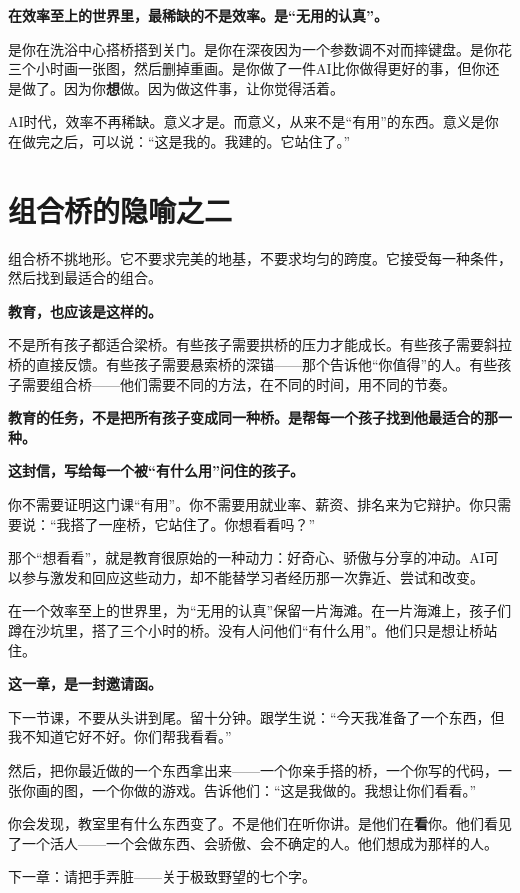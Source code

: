 \begin{insight}
\label{insight:chap14}

\textbf{在效率至上的世界里，最稀缺的不是效率。是``无用的认真''。}

是你在洗浴中心搭桥搭到关门。是你在深夜因为一个参数调不对而摔键盘。是你花三个小时画一张图，然后删掉重画。是你做了一件AI比你做得更好的事，但你还是做了。因为你\textbf{想}做。因为做这件事，让你觉得活着。

AI时代，效率不再稀缺。意义才是。而意义，从来不是``有用''的东西。意义是你在做完之后，可以说：``这是我的。我建的。它站住了。''
\end{insight}

\section{组合桥的隐喻之二}

组合桥不挑地形。它不要求完美的地基，不要求均匀的跨度。它接受每一种条件，然后找到最适合的组合。

\textbf{教育，也应该是这样的。}

不是所有孩子都适合梁桥。有些孩子需要拱桥的压力才能成长。有些孩子需要斜拉桥的直接反馈。有些孩子需要悬索桥的深锚——那个告诉他``你值得''的人。有些孩子需要组合桥——他们需要不同的方法，在不同的时间，用不同的节奏。

\textbf{教育的任务，不是把所有孩子变成同一种桥。是帮每一个孩子找到他最适合的那一种。}

\begin{shiyu-note}
\label{note:chap14}

\textbf{这封信，写给每一个被``有什么用''问住的孩子。}

你不需要证明这门课``有用''。你不需要用就业率、薪资、排名来为它辩护。你只需要说：``我搭了一座桥，它站住了。你想看看吗？''

那个``想看看''，就是教育很原始的一种动力：好奇心、骄傲与分享的冲动。AI可以参与激发和回应这些动力，却不能替学习者经历那一次靠近、尝试和改变。

在一个效率至上的世界里，为``无用的认真''保留一片海滩。在一片海滩上，孩子们蹲在沙坑里，搭了三个小时的桥。没有人问他们``有什么用''。他们只是想让桥站住。
\end{shiyu-note}

\vspace{1cm}

\begin{decision-point}
\label{decision:chap14}

\noindent\textbf{这一章，是一封邀请函。}

\vspace{0.3cm}

\noindent 下一节课，不要从头讲到尾。留十分钟。跟学生说：``今天我准备了一个东西，但我不知道它好不好。你们帮我看看。''

\noindent 然后，把你最近做的一个东西拿出来——一个你亲手搭的桥，一个你写的代码，一张你画的图，一个你做的游戏。告诉他们：``这是我做的。我想让你们看看。''

\noindent 你会发现，教室里有什么东西变了。不是他们在听你讲。是他们在\textbf{看}你。他们看见了一个活人——一个会做东西、会骄傲、会不确定的人。他们想成为那样的人。
\end{decision-point}

\vspace{0.5cm}

\begin{flushright}
{\small\color{muted} 下一章：请把手弄脏——关于极致野望的七个字。}
\end{flushright}
